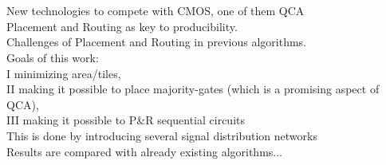 \chapter{\abstractname}

New technologies to compete with CMOS, one of them QCA \\
Placement and Routing as key to producibility. \\
Challenges of Placement and Routing in previous algorithms. \\
Goals of this work: \\I minimizing area/tiles, \\II making it possible to place majority-gates (which is a promising aspect of QCA), \\III making it possible to P\&R sequential circuits \\
This is done by introducing several signal distribution networks \\
Results are compared with already existing algorithms...



